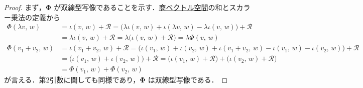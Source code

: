 \documentclass[rep_main]{subfiles}
\begin{document}
\begin{proof}
	まず，$\bm{\Phi}$ が双線型写像であることを示す．\hyperref[prop:quotient-vec]{商ベクトル空間}の和とスカラー乗法の定義から
	\begin{align}
		\Phi (\lambda v,\, w) &= \iota(v,\, w) + \mathcal{R} = \bigl( \lambda \iota(v,\, w) + \iota (\lambda v,\, w) - \lambda \iota (v,\, w) \bigr) + \mathcal{R} \\
		&= \lambda \iota (v,\, w) + \mathcal{R} = \lambda \bigl( \iota(v,\, w) + \mathcal{R} \bigr) = \lambda \Phi(v,\, w) \\
		\Phi (v_1 + v_2,\, w) &= \iota(v_1 + v_2,\, w) + \mathcal{R} = \bigl( \iota(v_1,\, w) + \iota (v_2,\, w) + \iota(v_1+v_2,\, w) - \iota (v_1,\, w) - \iota(v_2,\, w) \bigr) + \mathcal{R} \\
		&= \bigl(\iota (v_1,\, w) + \iota (v_2,\, w) \bigr) + \mathcal{R} = \bigl( \iota(v_1,\, w) + \mathcal{R} \bigr) + \bigl( \iota(v_2,\, w) + \mathcal{R} \bigr) \\
		&= \Phi(v_1,\, w) + \Phi(v_2,\, w)
	\end{align}
	が言える．第2引数に関しても同様であり，$\bm{\Phi}$ は双線型写像である．


\end{proof}
\end{document}
